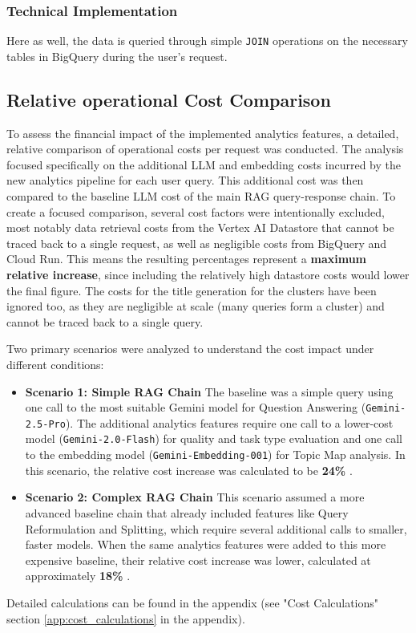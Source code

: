 \documentclass[
	english,
	ruledheaders=section,%
	class=report,%
	thesis={type=bachelor},%
	accentcolor=1b,%
	custommargins=true,%
	marginpar=false,%
	parskip=half-,%
	fontsize=11pt,%
	DIV=14,
]{tudapub}
\begin{document}
\subsubsection{Technical Implementation}
Here as well, the data is queried through simple \texttt{JOIN} operations on the necessary tables in BigQuery during the user's request.
\subsection{Relative operational Cost Comparison}
To assess the financial impact of the implemented analytics features, a detailed, relative comparison of operational costs per request was conducted. The analysis focused specifically on the additional LLM and embedding costs incurred by the new analytics pipeline for each user query. This additional cost was then compared to the baseline LLM cost of the main RAG query-response chain. To create a focused comparison, several cost factors were intentionally excluded, most notably data retrieval costs from the Vertex AI Datastore that cannot be traced back to a single request, as well as negligible costs from BigQuery and Cloud Run. This means the resulting percentages represent a \textbf{maximum relative increase}, since including the relatively high datastore costs would lower the final figure. The costs for the title generation for the clusters have been ignored too, as they are negligible at scale (many queries form a cluster) and cannot be traced back to a single query.

Two primary scenarios were analyzed to understand the cost impact under different conditions:

\begin{itemize}
    \item \textbf{Scenario 1: Simple RAG Chain} The baseline was a simple query using one call to the most suitable Gemini model for Question Answering (\texttt{Gemini-2.5-Pro}). The additional analytics features require one call to a lower-cost model (\texttt{Gemini-2.0-Flash}) for quality and task type evaluation and one call to the embedding model (\texttt{Gemini-Embedding-001}) for Topic Map analysis. In this scenario, the relative cost increase was calculated to be \textbf{24\%} \parencite{GoogleGeminiPricing}.

    \item \textbf{Scenario 2: Complex RAG Chain} This scenario assumed a more advanced baseline chain that already included features like Query Reformulation and Splitting, which require several additional calls to smaller, faster models. When the same analytics features were added to this more expensive baseline, their relative cost increase was lower, calculated at approximately \textbf{18\%} \parencite{GoogleGeminiPricing}.
\end{itemize}
Detailed calculations can be found in the appendix (see "Cost Calculations" section \ref{app:cost_calculations} in the appendix).
\end{document}
